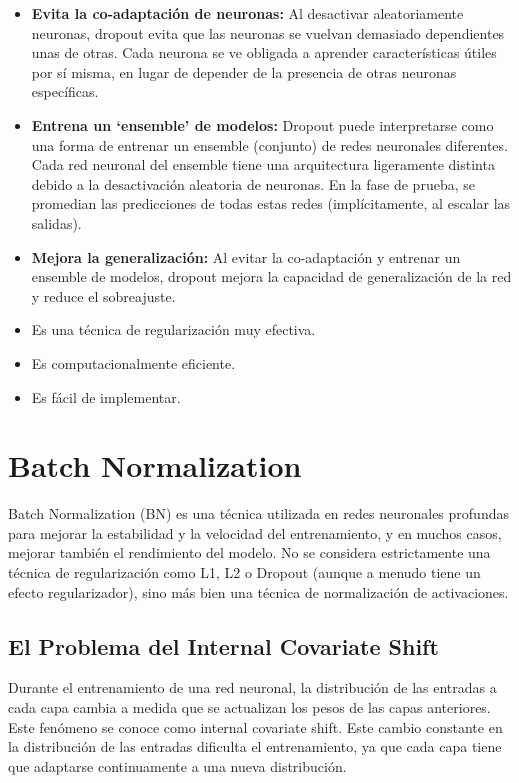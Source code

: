 \documentclass{article}
\begin{document}
\begin{itemize}
    \item \textbf{Evita la co-adaptación de neuronas:} Al desactivar aleatoriamente neuronas, dropout evita que las neuronas se vuelvan demasiado dependientes unas de otras.  Cada neurona se ve obligada a aprender características útiles por sí misma, en lugar de depender de la presencia de otras neuronas específicas.
    \item \textbf{Entrena un `ensemble' de modelos:}  Dropout puede interpretarse como una forma de entrenar un ensemble (conjunto) de redes neuronales diferentes.  Cada red neuronal del ensemble tiene una arquitectura ligeramente distinta debido a la desactivación aleatoria de neuronas.  En la fase de prueba, se promedian las predicciones de todas estas redes (implícitamente, al escalar las salidas).
    \item \textbf{Mejora la generalización:} Al evitar la co-adaptación y entrenar un ensemble de modelos, dropout mejora la capacidad de generalización de la red y reduce el sobreajuste.
\end{itemize}

\begin{itemize}
    \item Es una técnica de regularización muy efectiva.
    \item Es computacionalmente eficiente.
    \item Es fácil de implementar.
\end{itemize}

\section{Batch Normalization}

Batch Normalization (BN) es una técnica utilizada en redes neuronales profundas para mejorar la estabilidad y la velocidad del entrenamiento, y en muchos casos, mejorar también el rendimiento del modelo.  No se considera estrictamente una técnica de regularización como L1, L2 o Dropout (aunque a menudo tiene un efecto regularizador), sino más bien una técnica de normalización de activaciones.

\subsection{El Problema del Internal Covariate Shift}

Durante el entrenamiento de una red neuronal, la distribución de las entradas a cada capa cambia a medida que se actualizan los pesos de las capas anteriores.  Este fenómeno se conoce como internal covariate shift.  Este cambio constante en la distribución de las entradas dificulta el entrenamiento, ya que cada capa tiene que adaptarse continuamente a una nueva distribución.
\end{document}

